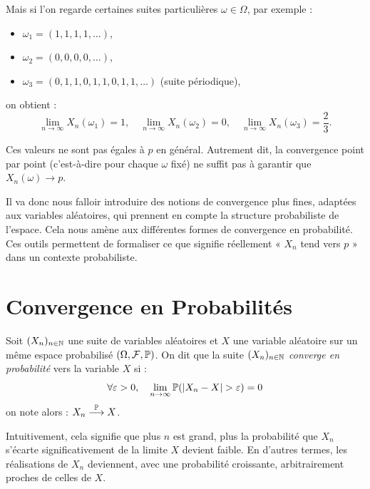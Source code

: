 Mais si l'on regarde certaines suites particulières $\omega \in \Omega$, par exemple :
\begin{itemize}
    \item $\omega_1 = (1,1,1,1,\dots)$,
    \item $\omega_2 = (0,0,0,0,\dots)$,
    \item $\omega_3 = (0,1,1,0,1,1,0,1,1,\dots)$ (suite périodique),
\end{itemize}

on obtient :
\[
    \lim_{n \to \infty} X_n(\omega_1) = 1, \quad 
    \lim_{n \to \infty} X_n(\omega_2) = 0, \quad 
    \lim_{n \to \infty} X_n(\omega_3) = \frac{2}{3}.
\]

Ces valeurs ne sont pas égales à $p$ en général.
Autrement dit, la convergence point par point (c’est-à-dire pour chaque $\omega$ fixé) ne suffit pas à garantir que $X_n(\omega) \to p$.

\vspace{0.3cm}

Il va donc nous falloir introduire des notions de convergence plus fines, adaptées aux variables aléatoires, 
qui prennent en compte la structure probabiliste de l’espace. Cela nous amène aux différentes formes de 
convergence en probabilité. Ces outils permettent de formaliser ce que signifie réellement « $X_n$ tend 
vers $p$ » dans un contexte probabiliste.


\section{Convergence en Probabilités}

\begin{definition}
    Soit $(X_n)_{n \in \mathbb{N}}$ une suite de variables aléatoires et $X$ une variable aléatoire sur un 
    même espace probabilisé $(\Omega, \mathcal{F}, \mathbb{P})$. On dit que la suite $(X_n)_{n \in \mathbb{N}}$ 
    \emph{converge en probabilité} vers la variable $X$ si : 
        \[ \forall \varepsilon > 0, \quad \lim_{n\to\infty} \mathbb{P}(|X_n - X| > \varepsilon) = 0 \] 
    on note alors : $ X_n \overset{\mathbb{P}}{\longrightarrow} X$. 
\end{definition}

Intuitivement, cela signifie que plus $n$ est grand, plus la probabilité que $X_n$ s'écarte significativement 
de la limite $X$ devient faible. En d'autres termes, les réalisations de $X_n$ deviennent, avec une 
probabilité croissante, arbitrairement proches de celles de $X$.

